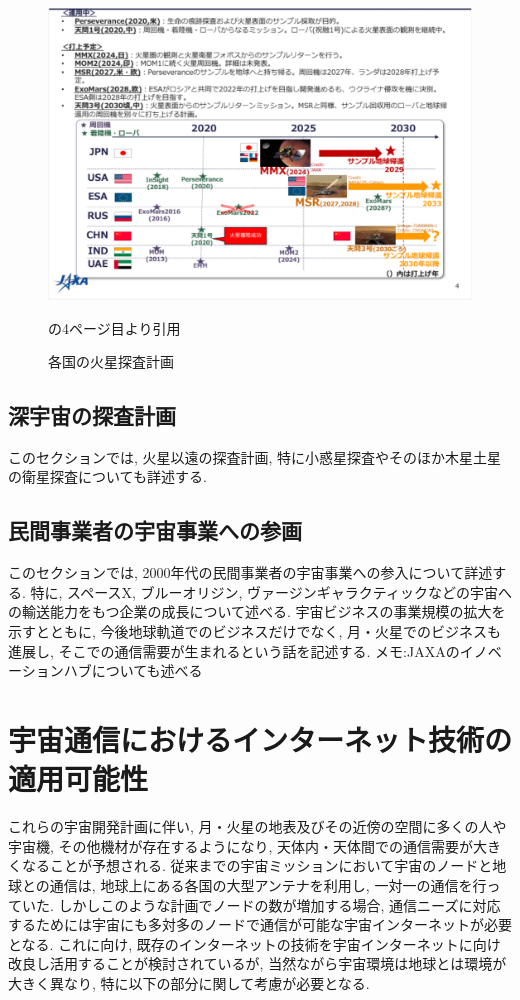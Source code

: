 \begin{figure}[tbh]
    \centering
    \includegraphics[width=0.7\textheight]{img/mars_explorations.pdf}
    \caption{各国の火星探査計画}
    \label{fig:mars_explorations}
    \begin{minipage}{\textwidth}
        \centering
        \cite{isas2023}の4ページ目より引用
    \end{minipage}
\end{figure}


\subsection{深宇宙の探査計画}
\label{section:深宇宙の探査計画}
このセクションでは, 火星以遠の探査計画, 特に小惑星探査やそのほか木星土星の衛星探査についても詳述する. 

\subsection{民間事業者の宇宙事業への参画}
\label{section:民間事業者の宇宙事業への参画}
このセクションでは, 2000年代の民間事業者の宇宙事業への参入について詳述する. 
特に, スペースX, ブルーオリジン, ヴァージンギャラクティックなどの宇宙への輸送能力をもつ企業の成長について述べる. 
宇宙ビジネスの事業規模の拡大を示すとともに, 今後地球軌道でのビジネスだけでなく, 月・火星でのビジネスも進展し, 
そこでの通信需要が生まれるという話を記述する. 
メモ:JAXAのイノベーションハブについても述べる

\section{宇宙通信におけるインターネット技術の適用可能性}
\label{section:宇宙通信におけるインターネット技術の適用性}
これらの宇宙開発計画に伴い,  月・火星の地表及びその近傍の空間に多くの人や宇宙機, その他機材が存在するようになり, 
天体内・天体間での通信需要が大きくなることが予想される.  
従来までの宇宙ミッションにおいて宇宙のノードと地球との通信は,  地球上にある各国の大型アンテナを利用し,  一対一の通信を行っていた. 
しかしこのような計画でノードの数が増加する場合, 通信ニーズに対応するためには宇宙にも多対多のノードで通信が可能な宇宙インターネットが必要となる.  
これに向け, 既存のインターネットの技術を宇宙インターネットに向け改良し活用することが検討されているが, 
当然ながら宇宙環境は地球とは環境が大きく異なり, 特に以下の部分に関して考慮が必要となる. 

